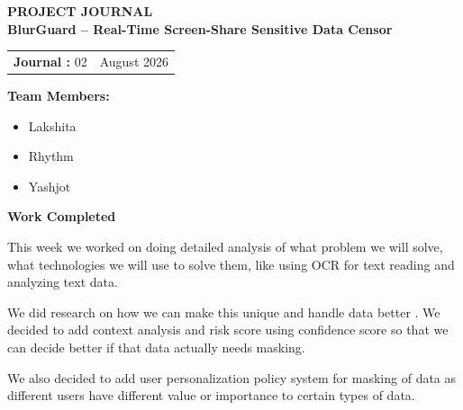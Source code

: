 \documentclass[12pt,a4paper]{article}
\begin{document}

\begin{center}
    {\Large \textbf{PROJECT JOURNAL }}\\[10pt]

    {\large \textbf{BlurGuard -- Real-Time Screen-Share Sensitive Data Censor}}
\end{center}

\vspace{10pt}


\begin{tabular}{@{}p{}p{}@{}}
\textbf{Journal :} 02 &
\raggedleft \textbf{} August 2026
\end{tabular}

\vspace{12pt}


\textbf{Team Members:}

\begin{itemize}[leftmargin=1.5cm]
    \item Lakshita
    \item Rhythm
    \item Yashjot
\end{itemize}

\vspace{5pt}


\textbf{\large Work Completed}

\vspace{4pt}
This week we worked on doing detailed analysis of what problem we will solve, what technologies we will use to solve them, like using OCR for text reading and analyzing text data.

We did research on how we can make this unique and handle data better . We decided to add context analysis and risk score using confidence score so that we can decide better if that data actually needs masking.

We also decided to add user personalization policy system for masking of data as different users have different value or importance to certain types of data.
\end{document}
